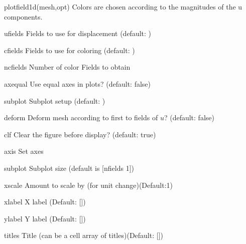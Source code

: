 \begin{codelist}

  \item[plotfield1d(mesh,opt)]
  Colors are chosen according to the magnitudes of the u components.
      \begin{codelist}
      \item[ufields]  Fields to use for displacement 
        (default: \ttt{[1]})
      \item[cfields]  Fields to use for coloring
        (default: \ttt{[1]})
      \item[ncfields] Number of color Fields to obtain
      \item[axequal]  Use equal axes in plots? (default: false)
      \item[subplot]  Subplot setup (default: )
      \item[deform]   Deform mesh according to first to fields of $u$?
        (default: false)
      \item[clf]      Clear the figure before display?
        (default: true)
      \item[axis]     Set axes
      \item[subplot]  Subplot size (default is [nfields 1])
      \item[xscale]   Amount to scale by (for unit change)(Default:1)
      \item[xlabel]   X label (Default: [])
      \item[ylabel]   Y label (Default: []) 
      \item[titles]   Title (can be a cell array of titles)(Default: []) 
      \end{codelist}


\end{codelist}
